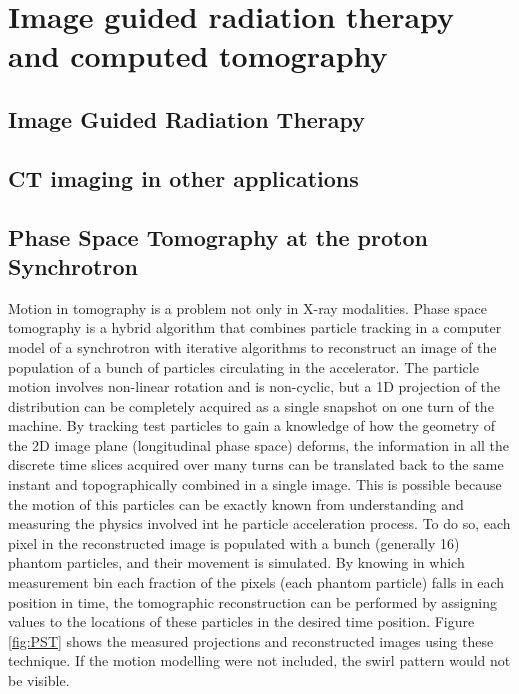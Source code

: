 \chapter{Image guided radiation therapy and computed tomography}\label{ch:soa}




\section{Image Guided Radiation Therapy}

\section{CT imaging in other applications}

\section{Phase Space Tomography at the proton Synchrotron}

Motion in tomography is a problem not only in X-ray modalities. Phase space tomography is a hybrid algorithm that combines particle tracking in a computer model of a synchrotron with iterative algorithms to reconstruct an image of the population of a bunch of particles circulating in the accelerator. The particle motion involves non-linear rotation and is non-cyclic, but a 1D projection of the distribution can be completely acquired as a single snapshot on one turn of the machine. By tracking test particles to gain a knowledge of how the geometry of the 2D image plane (longitudinal phase space) deforms, the information in all the discrete time slices acquired over many turns can be translated back to the same instant and topographically combined in a single image. This is possible because the motion of this particles can be exactly known from understanding and measuring the physics involved int he particle acceleration process. To do so, each pixel in the reconstructed image is populated with a bunch (generally 16) phantom particles, and their movement is simulated. By knowing in which measurement bin each fraction of the pixels (each phantom particle) falls in each position in time, the tomographic reconstruction can be performed by assigning values to the locations of these particles in the desired time position. Figure \ref{fig:PST} shows the measured projections and reconstructed images using these technique. If the motion modelling were not included, the swirl pattern would not be visible.


